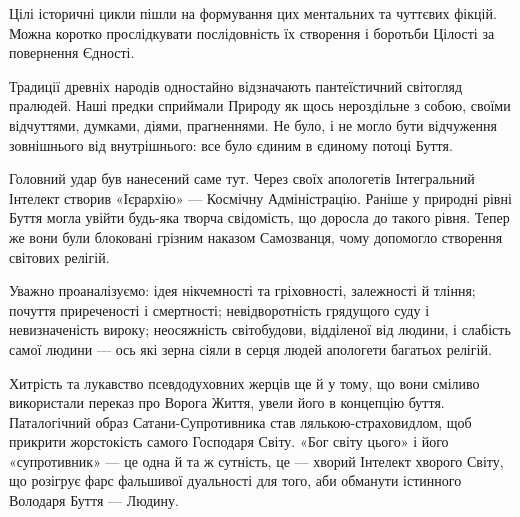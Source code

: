 Цілі історичні цикли пішли на формування цих ментальних та чуттєвих фікцій.
Можна коротко прослідкувати послідовність їх створення і боротьби Цілості за
повернення Єдності.

Традиції древніх народів одностайно відзначають пантеїстичний світогляд
пралюдей. Наші предки сприймали Природу як щось нероздільне з собою, своїми
відчуттями, думками, діями, прагненнями. Не було, і не могло бути відчуження
зовнішнього від внутрішнього: все було єдиним в єдиному потоці Буття.

Головний удар був нанесений саме тут. Через своїх апологетів Інтегральний
Інтелект створив «Ієрархію» — Космічну Адміністрацію. Раніше у природні рівні
Буття могла увійти будь-яка творча свідомість, що доросла до такого рівня.
Тепер же вони були блоковані грізним наказом Самозванця, чому допомогло
створення світових релігій.

Уважно проаналізуємо: ідея нікчемності та гріховності, залежності й тління;
почуття приреченості і смертності; невідворотність грядущого суду і
невизначеність вироку; неосяжність світобудови, відділеної від людини, і
слабість самої людини — ось які зерна сіяли в серця людей апологети багатьох
релігій.

Хитрість та лукавство псевдодуховних жерців ще й у тому, що вони сміливо
використали переказ про Ворога Життя, увели його в концепцію буття.
Паталогічний образ Сатани-Супротивника став лялькою-страховидлом, щоб прикрити
жорстокість самого Господаря Світу. «Бог світу цього» і його «супротивник» — це
одна й та ж сутність, це — хворий Інтелект хворого Світу, що розігрує фарс
фальшивої дуальності для того, аби обманути істинного Володаря Буття — Людину.

